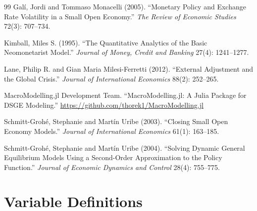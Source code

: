\documentclass[12pt]{article}
\begin{document}
\begin{thebibliography}{99}
Galí, Jordi and Tommaso Monacelli (2005).
\newblock ``Monetary Policy and Exchange Rate Volatility in a Small Open Economy.''
\newblock \textit{The Review of Economic Studies} 72(3): 707--734.

Kimball, Miles S. (1995).
\newblock ``The Quantitative Analytics of the Basic Neomonetarist Model.''
\newblock \textit{Journal of Money, Credit and Banking} 27(4): 1241--1277.

Lane, Philip R. and Gian Maria Milesi-Ferretti (2012).
\newblock ``External Adjustment and the Global Crisis.''
\newblock \textit{Journal of International Economics} 88(2): 252--265.

MacroModelling.jl Development Team.
\newblock ``MacroModelling.jl: A Julia Package for DSGE Modeling.''
\newblock \url{https://github.com/thorek1/MacroModelling.jl}

Schmitt-Grohé, Stephanie and Martín Uribe (2003).
\newblock ``Closing Small Open Economy Models.''
\newblock \textit{Journal of International Economics} 61(1): 163--185.

Schmitt-Grohé, Stephanie and Martín Uribe (2004).
\newblock ``Solving Dynamic General Equilibrium Models Using a Second-Order Approximation to the Policy Function.''
\newblock \textit{Journal of Economic Dynamics and Control} 28(4): 755--775.

\end{thebibliography}

\appendix

\section{Variable Definitions}
\end{document}
